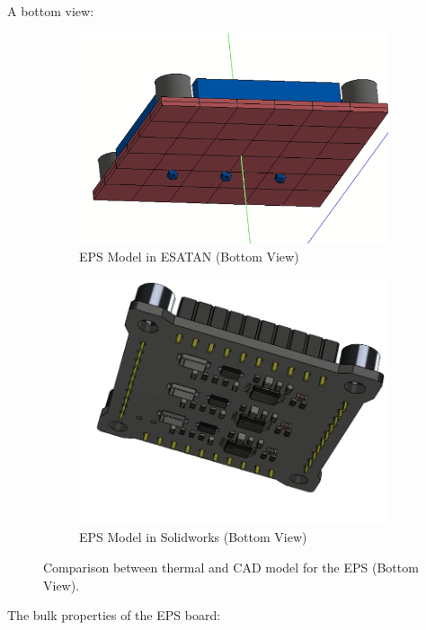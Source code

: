A bottom view:

\begin{figure}[H]
    \centering
    \begin{subfigure}{.5\textwidth}
      \centering
      \includegraphics[width=.6\linewidth]{res/img/5_simulationanalisys/Comparisons/ESATAN/EPS_bot.PNG}
      \caption{EPS Model in ESATAN (Bottom View)}
      \label{fig:epsraw}
    \end{subfigure}%
    \begin{subfigure}{.5\textwidth}
      \centering
      \includegraphics[width=.5\linewidth]{res/img/5_simulationanalisys/Comparisons/SLDW/EPS_bot_Solid.PNG}
      \caption{EPS Model in Solidworks (Bottom View)}
      \label{fig:epsrawsolid}
    \end{subfigure}
    \caption{Comparison between thermal and CAD model for the EPS (Bottom View).}
    \label{fig:epsrawim}
\end{figure}

The bulk properties of the EPS board:

